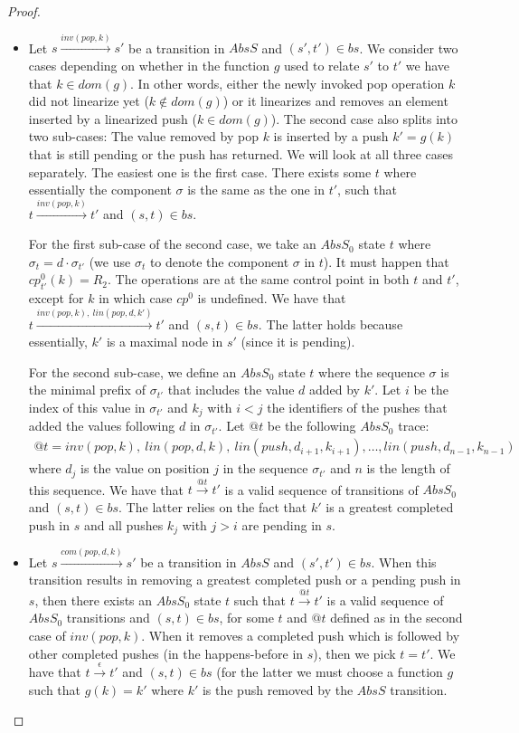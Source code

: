 \begin{proof}
\begin{itemize}
	\item Let $s\xrightarrow{inv(pop,k)} s'$ be a transition in $AbsS$ and $(s',t')\in bs$. We consider two cases depending on whether in the function $g$ used to relate $s'$ to $t'$ we have that $k\in dom(g)$. In other words, either the newly invoked pop operation $k$ did not linearize yet ($k\not\in dom(g)$) or it linearizes and removes an element inserted by a linearized push ($k\in dom(g)$). The second case also splits into two sub-cases: The value removed by pop $k$ is inserted by a push $k'=g(k)$ that is still pending or the push has returned. We will look at all three cases separately. 
	The easiest one is the first case. There exists some $t$ where essentially the component $\sigma$ is the same as the one in $t'$, such that $t\xrightarrow{inv(pop,k)} t'$ and $(s,t)\in bs$. 
	
	For the first sub-case of the second case, we take an $AbsS_0$ state $t$ where $\sigma_t = d\cdot\sigma_{t'}$ (we use $\sigma_t$ to denote the component $\sigma$ in $t$). It must happen that $cp^0_{t'}(k)=R_2$. The operations are at the same control point in both $t$ and $t'$, except for $k$ in which case $cp^0$ is undefined. We have that $t\xrightarrow{inv(pop,k),\ lin(pop,d,k')} t'$ and $(s,t)\in bs$. The latter holds because essentially, $k'$ is a maximal node in $s'$ (since it is pending). 

	For the second sub-case, we define an $AbsS_0$ state $t$ where the sequence $\sigma$ is the minimal prefix of $\sigma_{t'}$ that includes the value $d$ added by $k'$. Let $i$ be the index of this value in $\sigma_{t'}$ and $k_{j}$ with $i<j$ the identifiers of the pushes that added the values following $d$ in $\sigma_{t'}$.  Let $@t$ be the following $AbsS_0$ trace:
	\begin{align*}
	@t=inv(pop,k),\ lin(pop,d,k),\ lin(push,d_{i+1},k_{i+1}),\ldots,lin(push,d_{n-1},k_{n-1})
	\end{align*}
	where $d_j$ is the value on position $j$ in the sequence $\sigma_{t'}$ and $n$ is the length of this sequence. We have that $t\xrightarrow{@t} t'$ is a valid sequence of transitions of $AbsS_0$ and $(s,t)\in bs$. The latter relies on the fact that $k'$ is a greatest completed push in $s$ and all pushes $k_j$ with $j>i$ are pending in $s$.
	
	\item Let $s\xrightarrow{com(pop,d,k)} s'$ be a transition in $AbsS$ and $(s',t')\in bs$. When this transition results in removing a greatest completed push or a pending push in $s$, then there exists an $AbsS_0$ state $t$ such that $t\xrightarrow{@t} t'$ is a valid sequence of $AbsS_0$ transitions and $(s,t)\in bs$, for some $t$ and $@t$ defined as in the second case of $inv(pop,k)$. When it removes a completed push which is followed by other completed pushes (in the happens-before in $s$), then we pick $t=t'$. We have that $t\xrightarrow{\epsilon} t'$ and $(s,t)\in bs$ (for the latter we must choose a function $g$ such that $g(k)=k'$ where $k'$ is the push removed by the $AbsS$ transition.
	

\end{itemize}
\end{proof}
